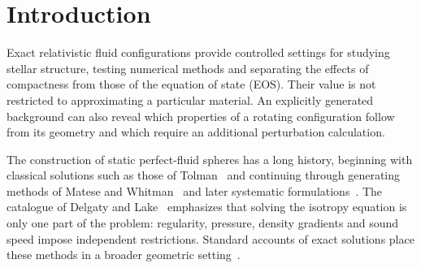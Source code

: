 \begin{abstract}
We construct a continuously stratified family of relativistic perfect-fluid spheres with exact background quadratures, algebraic frame dragging, and a finite surface satisfying $P\propto n^{5/3}$. A polynomial dragging profile determines the static geometry and gives the moment of inertia as a rational function of the family parameter. The Hartle--Thorne equations then supply the second-order rotational interior, matched to a vacuum exterior with an independently determined quadrupole. Published homogeneous-star and polytropic results benchmark the rotational calculation. Thermodynamic profiles, tides, fixed-baryon mass corrections and fixed-EOS radial stability characterize the family. Numerical boundaries distinguish loss of monotone stiffening at $M/R\simeq0.1624$, radial instability near $0.1751$, and loss of causality near $0.2745$. Selected configurations admit a smooth EOS continuation toward the high-density causal limit. Comparisons with Tolman VII, Buchdahl gas and an index-one polytrope illustrate the influence of stratification on rotational and tidal response.
\end{abstract}

\section{Introduction}
Exact relativistic fluid configurations provide controlled settings for studying stellar structure, testing numerical methods and separating the effects of compactness from those of the equation of state (EOS). Their value is not restricted to approximating a particular material. An explicitly generated background can also reveal which properties of a rotating configuration follow from its geometry and which require an additional perturbation calculation.

The construction of static perfect-fluid spheres has a long history, beginning with classical solutions such as those of Tolman~\cite{tolman} and continuing through generating methods of Matese and Whitman~\cite{matesewhitman} and later systematic formulations~\cite{lake,martin,rahman,boonserm}. The catalogue of Delgaty and Lake~\cite{delgaty} emphasizes that solving the isotropy equation is only one part of the problem: regularity, pressure, density gradients and sound speed impose independent restrictions. Standard accounts of exact solutions place these methods in a broader geometric setting~\cite{stephani}.


